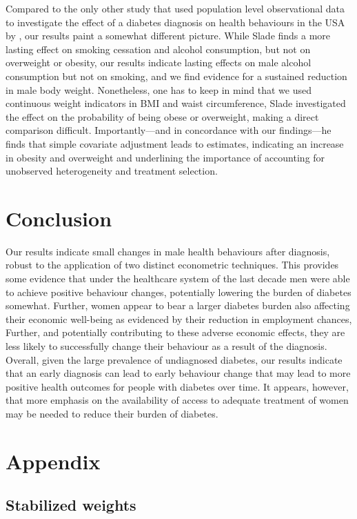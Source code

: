 Compared to the only other study that used population level observational data to investigate the effect of a diabetes diagnosis on health behaviours in the USA by \textcite{Slade2012}, our results paint a somewhat different picture. While Slade finds a more lasting effect on smoking cessation and alcohol consumption, but not on overweight or obesity, our results indicate lasting effects on male alcohol consumption but not on smoking, and we find evidence for a sustained reduction in male body weight. Nonetheless, one has to keep in mind that we used continuous weight indicators in \ac{BMI} and waist circumference, Slade investigated the effect on the probability of being obese or overweight, making a direct comparison difficult. Importantly---and in concordance with our findings---he finds that simple covariate adjustment leads to estimates, indicating an increase in obesity and overweight and underlining the importance of accounting for unobserved heterogeneity and treatment selection.

\section{Conclusion}

Our results indicate small changes in male health behaviours after diagnosis, robust to the application of two distinct econometric techniques. This provides some evidence that under the healthcare system of the last decade men were able to achieve positive behaviour changes, potentially lowering the burden of diabetes somewhat. Further, women appear to bear a larger diabetes burden also affecting their economic well-being as evidenced by their reduction in employment chances, Further, and potentially contributing to these adverse economic effects, they are less likely to successfully change their behaviour as a result of the diagnosis. Overall, given the large prevalence of undiagnosed diabetes, our results indicate that an early diagnosis can lead to early behaviour change that may lead to more positive health outcomes for people with diabetes over time. It appears, however, that more emphasis on the availability of access to adequate treatment of women may be needed to reduce their burden of diabetes.

\section*{\label{sec:Appendix}Appendix}

\subsection*{Stabilized weights}

